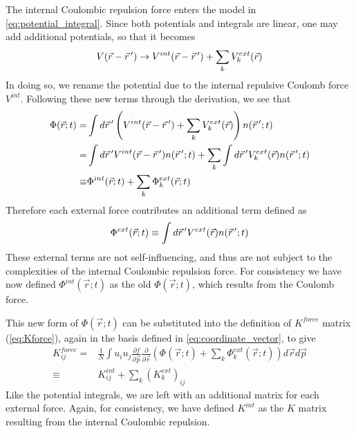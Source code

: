 The internal Coulombic repulsion force enters the model in \ref{eq:potential_integral}.
Since both potentials and integrals are linear, one may add additional potentials, so that it becomes
\begin{equation}
  V(\vec{r} - \vec{r}\,^{\prime}) \rightarrow V^{int}(\vec{r} - \vec{r}\,^{\prime}) + \sum_{k} V_{k}^{ext}(\vec{r})
\end{equation}
In doing so, we rename the potential due to the internal repulsive Coulomb force $V^{int}$.
Following these new terms through the derivation, we see that
\begin{equation}
  \begin{split}
    \Phi(\vec{r};t) = & \int d\vec{r}\,^{\prime} \left( V^{int}(\vec{r} - \vec{r}\,^{\prime}) + \sum_{k} V_{k}^{ext}(\vec{r}) \right) n(\vec{r}\,^{\prime}; t) \\
    = & \int d\vec{r}\,^{\prime} V^{int}(\vec{r} - \vec{r}\,^{\prime}) n(\vec{r}\,^{\prime}; t) + \sum_{k} \int d\vec{r}\,^{\prime} V_{k}^{ext}(\vec{r}) n(\vec{r}\,^{\prime}; t) \\
    \equiv & \Phi^{int}(\vec{r};t) + \sum_{k} \Phi_{k}^{ext}(\vec{r};t)
  \end{split}
\end{equation}
Therefore each external force contributes an additional term defined as
\begin{equation}
  \Phi^{ext}(\vec{r};t) \equiv \int d\vec{r}\,^{\prime} V^{ext}(\vec{r}) n(\vec{r}\,^{\prime}; t)
\end{equation}
These external terms are not self-influencing, and thus are not subject to the complexities of the internal Coulombic repulsion force.
For consistency we have now defined $\Phi^{int}(\vec{r};t)$ as the old $\Phi(\vec{r};t)$, which results from the Coulomb force. 

This new form of $\Phi(\vec{r};t)$ can be substituted into the definition of $K^{force}$ matrix (\ref{eq:Kforce}), again in the basis defined in \ref{eq:coordinate_vector}, to give
\begin{equation}
  \begin{split}
    K^{force}_{ij} = & \frac{1}{N} \int u_i u_j \frac{\partial f}{\partial \vec{p}} \frac{\partial}{\partial \vec{r}} \left( \Phi(\vec{r};t) + \sum_{k} \Phi_{k}^{ext}(\vec{r};t) \right) d\vec{r} d\vec{p} \\
    \equiv & K^{int}_{ij} + \sum_{k} (K_{k}^{ext})_{ij}
  \end{split}
\end{equation}
Like the potential integrals, we are left with an additional matrix for each external force.
Again, for consistency, we have defined $K^{int}$ as the $K$ matrix resulting from the internal Coulombic repulsion.

